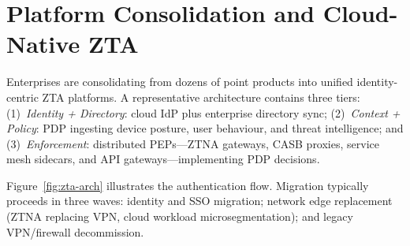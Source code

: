 \documentclass[sigconf,nonacm]{acmart}
\begin{document}
\section{Platform Consolidation and Cloud-Native ZTA}

Enterprises are consolidating from dozens of point products into unified
identity-centric ZTA platforms.  A representative architecture contains
three tiers: (1)~\emph{Identity + Directory}: cloud IdP plus enterprise
directory sync; (2)~\emph{Context + Policy}: PDP ingesting device
posture, user behaviour, and threat intelligence; and
(3)~\emph{Enforcement}: distributed PEPs---ZTNA gateways, CASB proxies,
service mesh sidecars, and API gateways---implementing PDP decisions.

Figure~\ref{fig:zta-arch} illustrates the authentication flow.
Migration typically proceeds in three waves: identity and SSO
migration; network edge replacement (ZTNA replacing VPN, cloud
workload microsegmentation); and legacy VPN/firewall decommission.
\end{document}
